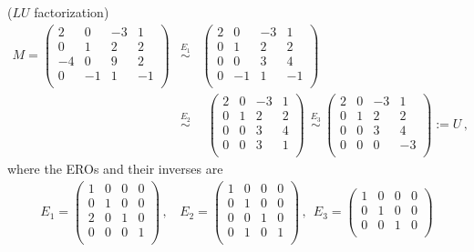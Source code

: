 \begin{example}\label{factorize} ($LU$ \hypertarget{elldeeeww}{ factorization})
\begin{eqnarray*}
M=
\begin{pmatrix}
2&0&-3&1\\
0&1&2&2\\
-4&0&9&2\\
0&-1&1&-1\\
\end{pmatrix}
&\stackrel{E_1}{\sim}&
\begin{pmatrix}
2&0&-3&1\\
0&1&2&2\\
0&0&3&4\\
0&-1&1&-1\\
\end{pmatrix}
\\[2mm]
&\stackrel{E_2}{\sim}&
~~\begin{pmatrix}
2&0&-3&1\\
0&1&2&2\\
0&0&3&4\\
0&0&3&1\\
\end{pmatrix}
~~\stackrel{E_3}{\sim}~
\begin{pmatrix}
2&0&-3&1\\
0&1&2&2\\
0&0&3&4\\
0&0&0&-3\\
\end{pmatrix}
:=U\, ,
\end{eqnarray*}
where the EROs and their inverses are 
\begin{eqnarray*}
E_1=
\begin{pmatrix}
1&0&0&0\\
0&1&0&0\\
2&0&1&0\\
0&0&0&1\\
\end{pmatrix} \, ,~~~~
E_2=
\begin{pmatrix}
1&0&0&0\\
0&1&0&0\\
0&0&1&0\\
0&1&0&1\\
\end{pmatrix} \, ,~~
E_3=
\begin{pmatrix}
1&0&0&0\\
0&1&0&0\\
0&0&1&0\\

\end{pmatrix}
\end{eqnarray*}
\end{example}
